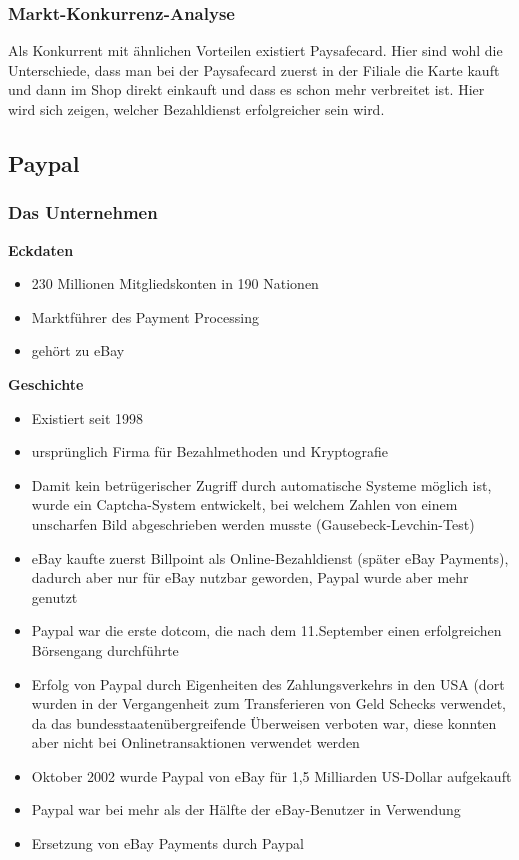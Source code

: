 \subsubsection{Markt-Konkurrenz-Analyse}
Als Konkurrent mit ähnlichen Vorteilen existiert Paysafecard. Hier sind wohl die Unterschiede, dass man bei der
Paysafecard zuerst in der Filiale die Karte kauft und dann im Shop direkt einkauft und dass es schon mehr verbreitet ist.
Hier wird sich zeigen, welcher Bezahldienst erfolgreicher sein wird.

\subsection{Paypal}
\subsubsection{Das Unternehmen}

\textbf{Eckdaten}
\begin{itemize}
\item 230 Millionen Mitgliedskonten in 190 Nationen
\item Marktführer des Payment Processing
\item gehört zu eBay
\end{itemize}
%
%
\textbf{Geschichte}
\begin{itemize}
\item Existiert seit 1998
\item ursprünglich Firma für Bezahlmethoden und Kryptografie
\item Damit kein betrügerischer Zugriff durch automatische Systeme möglich ist, wurde ein Captcha-System entwickelt, bei welchem Zahlen von einem unscharfen Bild abgeschrieben werden musste (Gausebeck-Levchin-Test)
\item eBay kaufte zuerst Billpoint als Online-Bezahldienst (später eBay Payments), dadurch aber nur für eBay nutzbar geworden, Paypal wurde aber mehr genutzt
\item Paypal war die erste dotcom, die nach dem 11.September einen erfolgreichen Börsengang durchführte
\item Erfolg von Paypal durch Eigenheiten des Zahlungsverkehrs in den USA (dort wurden in der Vergangenheit zum Transferieren von Geld Schecks verwendet, da das bundesstaatenübergreifende Überweisen verboten war, diese konnten aber nicht bei Onlinetransaktionen verwendet werden
\item Oktober 2002 wurde Paypal von eBay für 1,5 Milliarden US-Dollar aufgekauft
\item Paypal war bei mehr als der Hälfte der eBay-Benutzer in Verwendung
\item Ersetzung von eBay Payments durch Paypal
\end{itemize}

